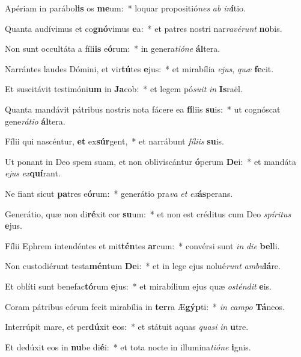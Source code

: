 \item Apériam in parábo\textbf{lis} os \textbf{me}um:~* loquar propositió\textit{nes} \textit{ab} \textit{in}\textbf{í}tio.
\item Quanta audívimus et co\textbf{gnó}vimus \textbf{e}a:~* et patres nostri nar\textit{ra}\textit{vé}\textit{runt} \textbf{no}bis.
\item Non sunt occultáta a fíli\textbf{is} e\textbf{ó}rum:~* in genera\textit{ti}\textit{ó}\textit{ne} \textbf{ál}tera.
\item Narrántes laudes Dómini, et vir\textbf{tú}tes \textbf{e}jus:~* et mirabília \textit{e}\textit{jus}, \textit{quæ} \textbf{fe}cit.
\item Et suscitávit testimóni\textbf{um} in \textbf{Ja}cob:~* et legem pó\textit{su}\textit{it} \textit{in} \textbf{Is}raël.
\item Quanta mandávit pátribus nostris nota fácere ea \textbf{fí}liis \textbf{su}is:~* ut cognóscat gene\textit{rá}\textit{ti}\textit{o} \textbf{ál}tera.
\item Fílii qui nascéntur, \textbf{et} ex\textbf{súr}gent,~* et narrábunt \textit{fí}\textit{li}\textit{is} \textbf{su}is.
\item Ut ponant in Deo spem suam, et non obliviscántur \textbf{ó}perum \textbf{De}i:~* et mandáta \textit{e}\textit{jus} \textit{ex}\textbf{quí}rant.
\item Ne fiant sicut \textbf{pa}tres e\textbf{ó}rum:~* generátio pra\textit{va} \textit{et} \textit{ex}\textbf{ás}perans.
\item Generátio, quæ non di\textbf{ré}xit cor \textbf{su}um:~* et non est créditus cum Deo \textit{spí}\textit{ri}\textit{tus} \textbf{e}jus.
\item Fílii Ephrem intendéntes et mit\textbf{tén}tes \textbf{ar}cum:~* convérsi sunt \textit{in} \textit{di}\textit{e} \textbf{bel}li.
\item Non custodiérunt testa\textbf{mén}tum \textbf{De}i:~* et in lege ejus nolué\textit{runt} \textit{am}\textit{bu}\textbf{lá}re.
\item Et oblíti sunt benefac\textbf{tó}rum \textbf{e}jus:~* et mirabílium ejus quæ \textit{os}\textit{tén}\textit{dit} \textbf{e}is.
\item Coram pátribus eórum fecit mirabília in \textbf{ter}ra Æ\textbf{gýp}ti:~* \textit{in} \textit{cam}\textit{po} \textbf{Tá}neos.
\item Interrúpit mare, et per\textbf{dú}xit \textbf{e}os:~* et státuit aquas \textit{qua}\textit{si} \textit{in} \textbf{u}tre.
\item Et dedúxit eos in \textbf{nu}be di\textbf{é}i:~* et tota nocte in illumina\textit{ti}\textit{ó}\textit{ne} \textbf{i}gnis.
